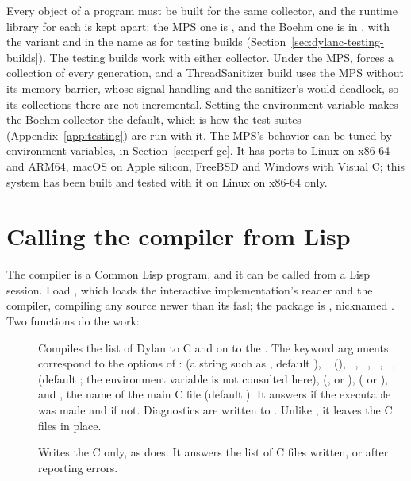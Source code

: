 Every object of a program must be built for the same collector, and the
runtime library for each is kept apart: the MPS one is
, and the Boehm one is in
, with the variant and
 in the name as for testing builds
(Section~\ref{sec:dylanc-testing-builds}). The testing builds work with
either collector. Under the MPS,  forces a
collection of every generation, and a ThreadSanitizer build uses the MPS
without its memory barrier, whose signal handling and the sanitizer's
would deadlock, so its collections there are not incremental. Setting
the environment variable  makes the Boehm
collector the default, which is how the test suites
(Appendix~\ref{app:testing}) are run with it. The MPS's behavior can be
tuned by environment variables, in Section~\ref{sec:perf-gc}. It has
ports to Linux on x86-64 and ARM64, macOS on Apple silicon, FreeBSD and
Windows with Visual C; this system has been built and tested with it on
Linux on x86-64 only.

\section{Calling the compiler from Lisp}\label{sec:dylanc-lisp}

The compiler is a Common Lisp program, and it can be called from a Lisp
session. Load , which loads the interactive
implementation's reader and the compiler, compiling any source newer
than its fasl; the package is , nicknamed
. Two functions do the work:

\begin{description}
\item[]
  Compiles the list of Dylan  to C and on to the
  . The keyword arguments correspond to the options of
  :  (a string such as ,
  default ), ~ (),
  ~, ~, ~,
  ~,  (default ; the
   environment variable is not consulted here),
   (,  or
  ),  ( or ), and
  , the name of the main C file (default
  ). It answers  if the
  executable was made and  if not. Diagnostics are written to
  . Unlike , it leaves the C files in
  place.
\item[]
  Writes the C only, as  does. It answers the list of C files
  written, or  after reporting errors.
\end{description}

